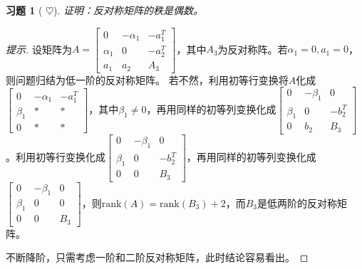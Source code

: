 \documentclass[UTF8]{ctexart}
\newcommand{\rank}{{\mathrm{rank}}}
\newtheorem{ex}[thm]{习题}
\begin{document}
\begin{ex}[ $\heartsuit  $]
	证明：反对称矩阵的秩是偶数。
\end{ex}
\begin{proof}[提示]
设矩阵为$A=\begin{bmatrix}
		0 & -\alpha_1 & - a_1^T\\
		\alpha_1 & 0 & -a_2^T\\
		a_1 & a_2 & A_3
	\end{bmatrix}$，其中$A_3$为反对称阵。若$\alpha_1=0,a_1=0$，则问题归结为低一阶的反对称矩阵。
	若不然，利用初等行变换将$A$化成$\begin{bmatrix}
		0 & -\alpha_1 & - a_1^T\\
		\beta_1 & * & *\\
		0 & * & *
	\end{bmatrix}$，其中$\beta_1\ne0$，再用同样的初等列变换化成$\begin{bmatrix}
		0 & -\beta_1 & 0\\
		\beta_1 & 0 & - b_2^T\\
		0 & b_2 & B_3
	\end{bmatrix}$。利用初等行变换化成$\begin{bmatrix}
		0 & -\beta_1 & 0\\
		\beta_1 & 0 & -b_2^T\\
		0 & 0 & B_3
	\end{bmatrix}$，再用同样的初等列变换化成$\begin{bmatrix}
		0 & -\beta_1 & 0\\
		\beta_1 & 0 & 0\\
		0 & 0 & B_3
	\end{bmatrix}$，则$\rank(A)=\rank(B_3)+2$，而$B_3$是低两阶的反对称矩阵。

	不断降阶，只需考虑一阶和二阶反对称矩阵，此时结论容易看出。
\end{proof}
\end{document}
